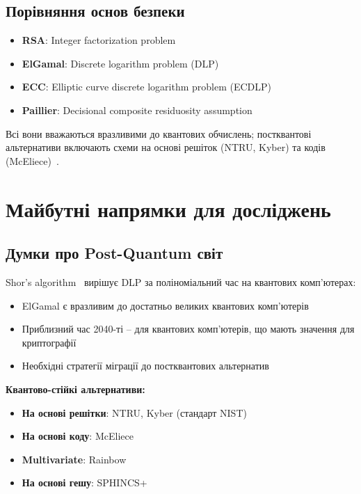 \subsection{Порівняння основ безпеки}

\begin{itemize}
    \item \textbf{RSA}: Integer factorization problem
    \item \textbf{ElGamal}: Discrete logarithm problem (DLP)
    \item \textbf{ECC}: Elliptic curve discrete logarithm problem (ECDLP)
    \item \textbf{Paillier}: Decisional composite residuosity assumption
\end{itemize}

Всі вони вважаються вразливими до квантових обчислень; постквантові альтернативи включають схеми на основі решіток
(NTRU, Kyber) та кодів (McEliece)~\cite{bernstein2009post}.

\section{Майбутні напрямки для досліджень}

\subsection{Думки про Post-Quantum світ}

Shor's algorithm~\cite{shor1997polynomial} вирішує DLP за поліноміальний час на квантових комп'ютерах:
\begin{itemize}
    \item ElGamal є вразливим до достатньо великих квантових комп'ютерів
    \item Приблизний час 2040-ті -- для квантових комп'ютерів, що мають значення для криптографії
    \item Необхідні стратегії міграції до постквантових альтернатив
\end{itemize}

\textbf{Квантово-стійкі альтернативи:}
\begin{itemize}
    \item \textbf{На основі решітки}: NTRU, Kyber (стандарт NIST)
    \item \textbf{На основі коду}: McEliece
    \item \textbf{Multivariate}: Rainbow
    \item \textbf{На основі гешу}: SPHINCS+
\end{itemize}

